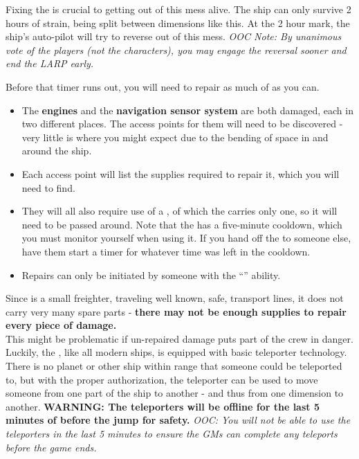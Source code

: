 \documentclass[green]{TMFHope}
\begin{document}
\name{\gFixTheShip{}}

Fixing the \pNew{} is crucial to getting out of this mess alive. The ship can only survive 2 hours of strain, being split between dimensions like this. At the 2 hour mark, the ship's auto-pilot will try to reverse out of this mess. \emph{OOC Note: By unanimous vote of the players (not the characters), you may engage the reversal sooner and end the LARP early.}

Before that timer runs out, you will need to repair as much of \pNew{} as you can. 
\begin{itemize}
  \item The \textbf{engines} and the \textbf{navigation sensor system} are both damaged, each in two different places. The access points for them will need to be discovered - very little is where you might expect due to the bending of space in and around the ship. 
  \item Each access point will list the supplies required to repair it, which you will need to find. 
	\item They will all also require use of a \textbf{\iTorch{\MYname{}}}, of which the \pNew{} carries only one, so it will need to be passed around.  Note that the \iTorch{\MYname{}} has a five-minute cooldown, which you must monitor yourself when using it.  If you hand off the \iTorch{\MYname{}} to someone else, have them start a timer for whatever time was left in the cooldown.
	\item Repairs can only be initiated by someone with the ``\aEngineering{\MYname}'' ability.
\end{itemize}
Since \pNew{} is a small freighter, traveling well known, safe, transport lines, it does not carry very many spare parts - \textbf{there may not be enough supplies to repair every piece of damage.}\\

This might be problematic if un-repaired damage puts part of the crew in danger. Luckily, the \pNew{}, like all modern ships, is equipped with basic teleporter technology. There is no planet or other ship within range that someone could be teleported to, but with the proper authorization, the teleporter can be used to move someone from one part of the ship to another - and thus from one dimension to another.  \textbf{WARNING: The teleporters will be offline for the last 5 minutes of before the jump for safety.} \emph{OOC: You will not be able to use the teleporters in the last 5 minutes to ensure the GMs can complete any teleports before the game ends.}
\end{document}
